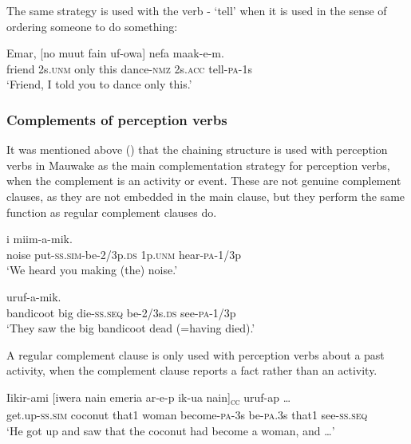 The same strategy is used with the verb - `tell' when it is used in the sense of ordering someone to do something: 

\ea%
\label{ex:8:x1630}
\gll Emar,  [no  muut  fain  uf-owa]  nefa  maak-e-m.\\
friend  2s.\textsc{unm} only  this  dance-\textsc{nmz} 2s.\textsc{acc} tell-\textsc{pa}-1s\\
\glt`Friend, I told you to dance only this.'
\z


\subsubsection{Complements of perception verbs} \label{sec:8.3.2.2}

It was mentioned above () that the chaining structure is used with perception verbs in Mauwake as the main complementation strategy for perception verbs, when the complement is an activity or event. These are not genuine complement clauses, as they are not embedded in the main clause, but they perform the same function as regular complement clauses do. 

\ea%
\label{ex:8:x1512}
  i  miim-a-mik.\\
noise  put-\textsc{ss}.\textsc{sim}-be-2/3p.\textsc{ds} 1p.\textsc{unm}  hear-\textsc{pa}-1/3p\\
\glt`We heard you making (the) noise.'
\z


\ea%
\label{ex:8:x1600}
  uruf-a-mik. \\
bandicoot  big  die-\textsc{ss}.\textsc{seq} be-2/3s.\textsc{ds}  see-\textsc{pa}-1/3p\\
\glt`They saw the big bandicoot dead (=having died).'
\z


A regular complement clause is only used with perception verbs about a past activity, when the complement clause reports a fact rather than an activity. 

\ea%
\label{ex:8:x1628}
\gll Iikir-ami  [iwera  nain  emeria  ar-e-p  ik-ua nain]\textsubscript{\textsc{cc}}  uruf-ap  {\dots}\\
get.up-\textsc{ss}.\textsc{sim} coconut that1 woman become-\textsc{pa}-3s be-\textsc{pa}.3s that1 see-\textsc{ss}.\textsc{seq}\\
\glt`He got up and saw that the coconut had become a woman, and {\dots}'
\z


